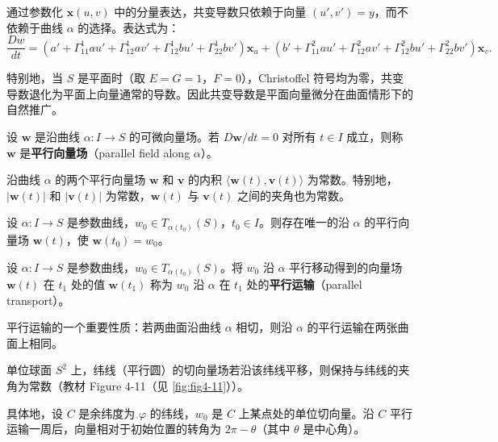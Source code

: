 通过参数化 $\mathbf{x}(u,v)$ 中的分量表达，共变导数只依赖于向量 $(u',v') = y$，而不依赖于曲线 $\alpha$ 的选择。表达式为：
\[
\frac{Dw}{dt} = \left(a' + \Gamma_{11}^1 a u' + \Gamma_{12}^1 a v' + \Gamma_{12}^1 b u' + \Gamma_{22}^1 b v'\right)\mathbf{x}_u
+ \left(b' + \Gamma_{11}^2 a u' + \Gamma_{12}^2 a v' + \Gamma_{12}^2 b u' + \Gamma_{22}^2 b v'\right)\mathbf{x}_v.
\label{eq:covariant-derivative}
\]

特别地，当 $S$ 是平面时（取 $E=G=1$，$F=0$），Christoffel 符号均为零，共变导数退化为平面上向量通常的导数。因此共变导数是平面向量微分在曲面情形下的自然推广。

\begin{Definition}[平行向量场]\label{def:parallel-field}
设 $\mathbf{w}$ 是沿曲线 $\alpha: I \to S$ 的可微向量场。若 $D\mathbf{w}/dt = 0$ 对所有 $t \in I$ 成立，则称 $\mathbf{w}$ 是\textbf{平行向量场}（parallel field along $\alpha$）。
\end{Definition}

\begin{Proposition}[平行场的保角性]\label{prop:parallel-preserves-angle}
沿曲线 $\alpha$ 的两个平行向量场 $\mathbf{w}$ 和 $\mathbf{v}$ 的内积 $\langle \mathbf{w}(t), \mathbf{v}(t) \rangle$ 为常数。特别地，$|\mathbf{w}(t)|$ 和 $|\mathbf{v}(t)|$ 为常数，$\mathbf{w}(t)$ 与 $\mathbf{v}(t)$ 之间的夹角也为常数。
\end{Proposition}

\begin{Proposition}[平行运输的存在唯一性]\label{prop:parallel-transport}
设 $\alpha: I \to S$ 是参数曲线，$w_0 \in T_{\alpha(t_0)}(S)$，$t_0 \in I$。则存在唯一的沿 $\alpha$ 的平行向量场 $\mathbf{w}(t)$，使 $\mathbf{w}(t_0) = w_0$。
\end{Proposition}

\begin{Definition}[平行运输]\label{def:parallel-transport}
设 $\alpha: I \to S$ 是参数曲线，$w_0 \in T_{\alpha(t_0)}(S)$。将 $w_0$ 沿 $\alpha$ 平行移动得到的向量场 $\mathbf{w}(t)$ 在 $t_1$ 处的值 $\mathbf{w}(t_1)$ 称为 $w_0$ 沿 $\alpha$ 在 $t_1$ 处的\textbf{平行运输}（parallel transport）。
\end{Definition}

平行运输的一个重要性质：若两曲面沿曲线 $\alpha$ 相切，则沿 $\alpha$ 的平行运输在两张曲面上相同。

\begin{Example}[球面上的平行运输]\label{ex:parallel-sphere}
单位球面 $S^2$ 上，纬线（平行圆）的切向量场若沿该纬线平移，则保持与纬线的夹角为常数（教材 Figure 4-11（见 \cref{fig:fig4-11}））。

具体地，设 $C$ 是余纬度为 $\varphi$ 的纬线，$w_0$ 是 $C$ 上某点处的单位切向量。沿 $C$ 平行运输一周后，向量相对于初始位置的转角为 $2\pi - \theta$（其中 $\theta$ 是中心角）。
\end{Example}

